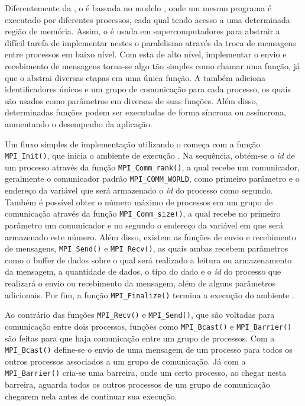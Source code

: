 Diferentemente da \OpenMP, o \MPI é baseada no modelo \SPMD, onde um mesmo programa é executado por diferentes processos, cada qual tendo acesso a uma determinada região de memória. Assim, o \MPI é usada em supercomputadores para abstrair a difícil tarefa de implementar nestes o paralelismo através da troca de mensagens entre processos em baixo nível. Com esta \API de alto nível, implementar o envio e recebimento de mensagens torna-se algo tão simples como chamar uma função, já que o \MPI abstrai diversas etapas em uma única função. A \API também adiciona identificadores únicos e um grupo de comunicação para cada processo, os quais são usados como parâmetros em diversas de suas funções. Além disso, determinadas funções podem ser executadas de forma síncrona ou assíncrona, aumentando o desempenho da aplicação.

Um fluxo simples de implementação utilizando o \MPI começa com a função \texttt{MPI\_Init()}, que inicia o ambiente de execução \MPI. Na sequência, obtém-se o \textit{id} de um processo através da função \texttt{MPI\_Comm\_rank()}, a qual recebe um comunicador, geralmente o comunicador padrão \texttt{MPI\_COMM\_WORLD}, como primeiro parâmetro e o endereço da variável que será armazenado o \textit{id} do processo como segundo. Também é possível obter o número máximo de processos em um grupo de comunicação através da função \texttt{MPI\_Comm\_size()}, a qual recebe no primeiro parâmetro um comunicador e no segundo o endereço da variável em que será armazenado este número. Além disso, existem as funções de envio e recebimento de mensagens, \texttt{MPI\_Send()} e \texttt{MPI\_Recv()}, as quais ambas recebem parâmetros como o buffer de dados sobre o qual será realizado a leitura ou armazenamento da mensagem, a quantidade de dados, o tipo do dado e o \textit{id} do processo que realizará o envio ou recebimento da mensagem, além de alguns parâmetros adicionais. Por fim, a função \texttt{MPI\_Finalize()} termina a execução do ambiente \MPI.

Ao contrário das funções \texttt{MPI\_Recv()} e \texttt{MPI\_Send()}, que são voltadas para comunicação entre dois processos, funções como \texttt{MPI\_Bcast()} e \texttt{MPI\_Barrier()} são feitas para que haja comunicação entre um grupo de processos. Com a \texttt{MPI\_Bcast()} define-se o envio de uma mensagem de um processo para todos os outros processos associados a um grupo de comunicação. Já com a \texttt{MPI\_Barrier()} cria-se uma barreira, onde um certo processo, ao chegar nesta barreira, aguarda todos os outros processos de um grupo de comunicação chegarem nela antes de continuar sua execução.

